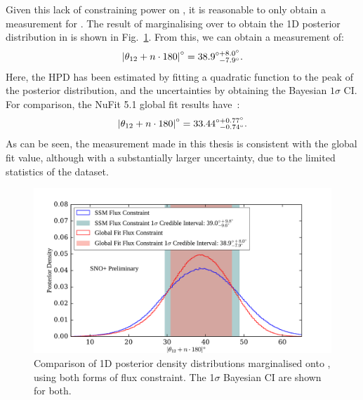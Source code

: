 Given this lack of constraining power on \dmsq{}, it is reasonable to only obtain a measurement for \tonetwo{}. The result of marginalising over \dmsq{} to obtain the 1D posterior distribution in \tonetwo{} is shown in Fig.~\ref{fig:1d_theta_12_posterior}. From this, we can obtain a measurement of:
\begin{equation*}
    \left|\theta_{12}{} + n\cdot180\right|^{\circ} = 38.9^{\circ+8.0^{\circ}}_{\phantom{\circ}-7.9^{\circ}}.
\end{equation*}
Here, the HPD has been estimated by fitting a quadratic function to the peak of the posterior distribution, and the uncertainties by obtaining the Bayesian $1\sigma$ CI. For comparison, the NuFit 5.1 global fit results have~\cite{estebanFateHintsUpdated2020}: %
\begin{equation*}
    \left|\theta_{12}{} + n\cdot180\right|^{\circ} = 33.44^{\circ+0.77^{\circ}}_{\phantom{\circ}-0.74^{\circ}}.
\end{equation*}
As can be seen, the measurement made in this thesis is consistent with the global fit value, although with a substantially larger uncertainty, due to the limited statistics of the dataset.

\begin{figure}[!th]
    \centering
    \includegraphics[width=\textwidth]{6_SolarAnalysis/images/theta_12_comparison_flux_constraint_corrected_tagging_2_mobins.pdf}
    \caption[Comparison of 1D posterior density distribution marginalised onto \tonetwo{} for different flux constraints]
    {Comparison of 1D posterior density distributions marginalised onto \tonetwo{}, using both forms of \beight{} flux constraint. The 1$\sigma$ Bayesian CI are shown for both.}
    \label{fig:1d_theta_12_posterior}
\end{figure}

